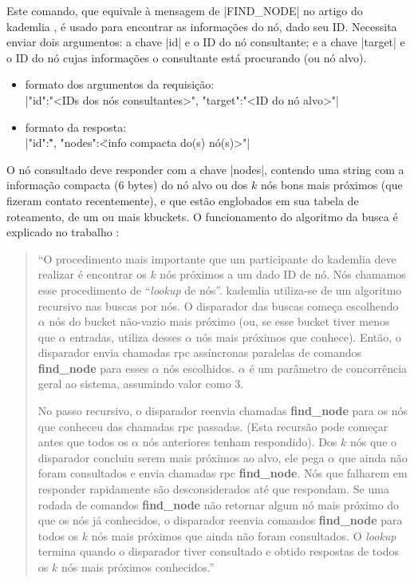 
\newpage
{}

Este comando, que equivale à mensagem de \bverb|FIND_NODE| no artigo do \gls*{kademlia}
\cite{artigo:kademlia}, é usado para encontrar as informações do nó, dado seu ID.
Necessita enviar dois argumentos: a chave \bverb|id| e o ID do nó consultante; e a chave
\bverb|target| e o ID do nó cujas informações o consultante está procurando (ou nó
alvo).

\begin{itemize}
    \item formato dos argumentos da requisição: \\
        \sverb|{"id":"<IDs dos nós consultantes>", "target":"<ID do nó alvo>"}|

    \item formato da resposta: \\
        \sverb|{"id":\"<IDs dos nós consultados>", "nodes":\"<info compacta do(s) nó(s)>"}|
\end{itemize}

O nó consultado deve responder com a chave \bverb|nodes|, contendo uma \gls*{string} com
a informação compacta (6 bytes) do nó alvo ou dos $k$ nós bons mais próximos (que
fizeram contato recentemente), e que estão englobados em sua tabela de roteamento, de um
ou mais \glspl*{kbucket}. O funcionamento do algoritmo da busca é explicado no trabalho
\cite{artigo:kademlia-springer}:

\blockquote{``O procedimento mais importante que um participante do \gls*{kademlia} deve
realizar é encontrar os $k$ nós próximos a um dado ID de nó. Nós chamamos esse
procedimento de \enquote{\emph{lookup} de nós}. \gls*{kademlia} utiliza-se de um
algoritmo recursivo nas buscas por nós. O disparador das buscas começa escolhendo
$\alpha$ nós do \gls*{bucket} não-vazio mais próximo (ou, se esse \gls*{bucket} tiver
menos que $\alpha$ entradas, utiliza desses $\alpha$ nós mais próximos que conhece).
Então, o disparador envia chamadas \gls*{rpc} assíncronas paralelas de comandos
\textbf{find\_node} para esses $\alpha$ nós escolhidos. $\alpha$ é um parâmetro de
concorrência geral ao sistema, assumindo valor como 3.

No passo recursivo, o disparador reenvia chamadas \textbf{find\_node} para os nós que
conheceu das chamadas \gls*{rpc} passadas. (Esta recursão pode começar antes que todos
os $\alpha$ nós anteriores tenham respondido). Dos $k$ nós que o disparador concluiu
serem mais próximos ao alvo, ele pega $\alpha$ que ainda não foram consultados e envia
chamadas \gls*{rpc} \textbf{find\_node}. Nós que falharem em responder rapidamente são
desconsiderados até que respondam. Se uma rodada de comandos \textbf{find\_node} não
retornar algum nó mais próximo do que os nós já conhecidos, o disparador reenvia
comandos \textbf{find\_node} para todos os $k$ nós mais próximos que ainda não foram
consultados. O \emph{lookup} termina quando o disparador tiver consultado e obtido
respostas de todos os $k$ nós mais próximos conhecidos.''}

